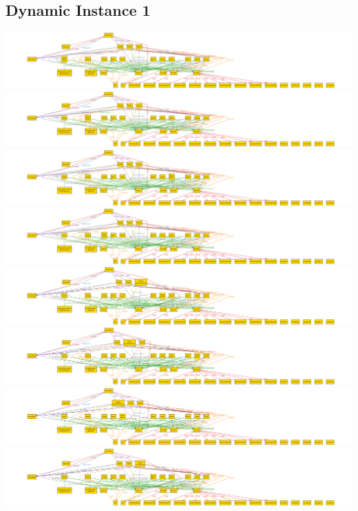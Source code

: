 \documentclass[12pt,a4paper,titlepage]{article}
\begin{document}
\subsection{Dynamic Instance 1}
\includegraphics[width=\textwidth]{dynamic_instance_1_time_0}
\includegraphics[width=\textwidth]{dynamic_instance_1_time_1}
\includegraphics[width=\textwidth]{dynamic_instance_1_time_2}
\includegraphics[width=\textwidth]{dynamic_instance_1_time_3}
\includegraphics[width=\textwidth]{dynamic_instance_1_time_4}
\includegraphics[width=\textwidth]{dynamic_instance_1_time_5}
\includegraphics[width=\textwidth]{dynamic_instance_1_time_6}
\includegraphics[width=\textwidth]{dynamic_instance_1_time_7}
\end{document}
